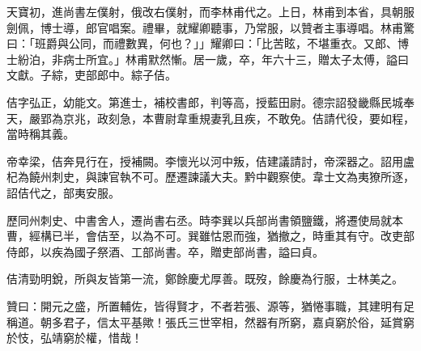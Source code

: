 \begin{pinyinscope}
 天寶初，進尚書左僕射，俄改右僕射，而李林甫代之。上日，林甫到本省，具朝服劍佩，博士導，郎官唱案。禮畢，就耀卿聽事，乃常服，以贊者主事導唱。林甫驚曰：「班爵與公同，而禮數異，何也？」」耀卿曰：「比苦眩，不堪重衣。又郎、博士紛泊，非病士所宜。」林甫默然慚。居一歲，卒，年六十三，贈太子太傅，謚曰文獻。子綜，吏部郎中。綜子佶。



 佶字弘正，幼能文。第進士，補校書郎，判等高，授藍田尉。德宗詔發畿縣民城奉天，嚴郢為京兆，政刻急，本曹尉韋重規妻乳且疾，不敢免。佶請代役，要如程，當時稱其義。



 帝幸梁，佶奔見行在，授補闕。李懷光以河中叛，佶建議請討，帝深器之。詔用盧杞為饒州刺史，與諫官執不可。歷遷諫議大夫。黔中觀察使。韋士文為夷獠所逐，詔佶代之，部夷安服。



 歷同州刺史、中書舍人，遷尚書右丞。時李巽以兵部尚書領鹽鐵，將遷使局就本曹，經構已半，會佶至，以為不可。巽雖怙恩而強，猶撤之，時重其有守。改吏部侍郎，以疾為國子祭酒、工部尚書。卒，贈吏部尚書，謚曰貞。



 佶清勁明銳，所與友皆第一流，鄭餘慶尤厚善。既歿，餘慶為行服，士林美之。



 贊曰：開元之盛，所置輔佐，皆得賢才，不者若張、源等，猶惓事職，其建明有足稱道。朝多君子，信太平基歟！張氏三世宰相，然器有所窮，嘉貞窮於俗，延賞窮於忮，弘靖窮於權，惜哉！



\end{pinyinscope}